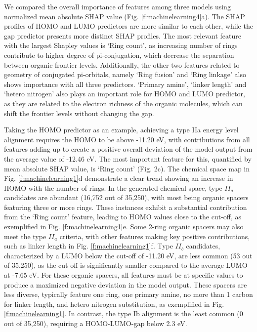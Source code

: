 We compared the overall importance of features among three models using normalized mean absolute SHAP value (Fig. \ref{f:machinelearning4}a). The SHAP profiles of HOMO and LUMO predictors are more similar to each other, while the gap predictor presents more distinct SHAP profiles. The most relevant feature with the largest Shapley values is ‘Ring count’, as increasing number of rings contribute to higher degree of pi-conjugation, which decrease the separation between organic frontier levels. Additionally, the other two features related to geometry of conjugated pi-orbitals, namely ‘Ring fusion’ and ‘Ring linkage’ also shows importance with all three predictors. ‘Primary amine’, ‘linker length’ and ‘hetero nitrogen’ also plays an important role for HOMO and LUMO predictor, as they are related to the electron richness of the organic molecules, which can shift the frontier levels without changing the gap.

Taking the HOMO predictor as an example, achieving a type IIa energy level alignment requires the HOMO to be above -11.20 eV, with contributions from all features adding up to create a positive overall deviation of the model output from the average value of -12.46 eV. The most important feature for this, quantified by mean absolute SHAP value, is ‘Ring count’ (Fig. 2c). The chemical space map in Fig. \ref{f:machinelearning1}d demonstrate a clear trend showing an increase in HOMO with the number of rings. In the generated chemical space, type $II_a$ candidates are abundant (16,752 out of 35,250), with most being organic spacers featuring three or more rings. These instances exhibit a substantial contribution from the ‘Ring count’ feature, leading to HOMO values close to the cut-off, as exemplified in Fig. \ref{f:machinelearning1}e. Some 2-ring organic spacers may also meet the type $II_a$ criteria, with other features making key positive contributions, such as linker length in Fig. \ref{f:machinelearning1}f. Type $II_b$ candidates, characterized by a LUMO below the cut-off of -11.20 eV, are less common (53 out of 35,250), as the cut off is significantly smaller compared to the average LUMO at -7.65 eV. For these organic spacers, all features must be at specific values to produce a maximized negative deviation in the model output. These spacers are less diverse, typically feature one ring, one primary amine, no more than 1 carbon for linker length, and hetero nitrogen substitution, as exemplified in Fig. \ref{f:machinelearning1}. In contrast, the type Ib alignment is the least common (0 out of 35,250), requiring a HOMO-LUMO-gap below 2.3 eV.  

